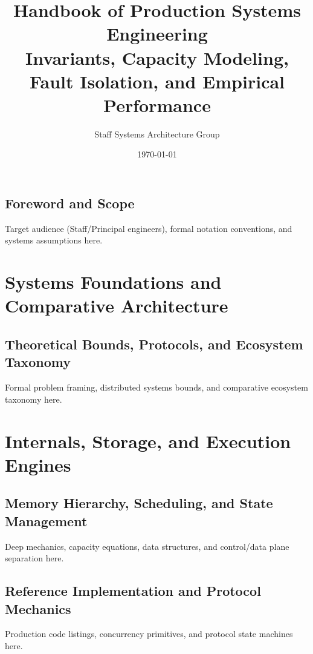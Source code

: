 \documentclass[11pt,oneside]{book}
\title{\textbf{Handbook of Production Systems Engineering}\\[0.5em]\large Invariants, Capacity Modeling, Fault Isolation, and Empirical Performance}
\author{Staff Systems Architecture Group}
\date{\today}
\begin{document}
\frontmatter
\maketitle
\tableofcontents

\chapter*{Foreword and Scope}
Target audience (Staff/Principal engineers), formal notation conventions, and systems assumptions here.

\mainmatter

\part{Systems Foundations and Comparative Architecture}

\chapter{Theoretical Bounds, Protocols, and Ecosystem Taxonomy}
\label{ch:foundations}
Formal problem framing, distributed systems bounds, and comparative ecosystem taxonomy here.

\part{Internals, Storage, and Execution Engines}

\chapter{Memory Hierarchy, Scheduling, and State Management}
\label{ch:internals}
Deep mechanics, capacity equations, data structures, and control/data plane separation here.

\chapter{Reference Implementation and Protocol Mechanics}
\label{ch:implementation}
Production code listings, concurrency primitives, and protocol state machines here.
\end{document}
